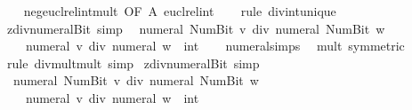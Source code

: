 \begin{isabellebody}
%
\isadelimproof
\ \ %
\endisadelimproof
%
\isatagproof
{}\isamarkupfalse%
\ neg{\isacharunderscore}{\kern0pt}eucl{\isacharunderscore}{\kern0pt}rel{\isacharunderscore}{\kern0pt}int{\isacharunderscore}{\kern0pt}mult{\isacharunderscore}{\kern0pt}{}\ {\isacharbrackleft}{\kern0pt}OF\ A\ eucl{\isacharunderscore}{\kern0pt}rel{\isacharunderscore}{\kern0pt}int{\isacharbrackright}{\kern0pt}\isanewline
\ \ \isamarkupfalse%
\ {\isacharparenleft}{\kern0pt}rule\ div{\isacharunderscore}{\kern0pt}int{\isacharunderscore}{\kern0pt}unique{\isacharparenright}{\kern0pt}%
\endisatagproof
{\isafoldproof}%
%
\isadelimproof
\isanewline
%
\endisadelimproof
\isanewline
{}\isamarkupfalse%
\ zdiv{\isacharunderscore}{\kern0pt}numeral{\isacharunderscore}{\kern0pt}Bit{}\ {\isacharbrackleft}{\kern0pt}simp{\isacharbrackright}{\kern0pt}{\isacharcolon}{\kern0pt}\isanewline
\ \ {\isachardoublequoteopen}numeral\ {\isacharparenleft}{\kern0pt}Num{\isachardot}{\kern0pt}Bit{}\ v{\isacharparenright}{\kern0pt}\ div\ numeral\ {\isacharparenleft}{\kern0pt}Num{\isachardot}{\kern0pt}Bit{}\ w{\isacharparenright}{\kern0pt}\ {\isacharequal}{\kern0pt}\isanewline
\ \ \ \ numeral\ v\ div\ {\isacharparenleft}{\kern0pt}numeral\ w\ {\isacharcolon}{\kern0pt}{\isacharcolon}{\kern0pt}\ int{\isacharparenright}{\kern0pt}{\isachardoublequoteclose}\isanewline
%
\isadelimproof
\ \ %
\endisadelimproof
%
\isatagproof
{}\isamarkupfalse%
\ numeral{\isachardot}{\kern0pt}simps\ \isamarkupfalse%
\ mult{\isacharunderscore}{\kern0pt}{}\ {\isacharbrackleft}{\kern0pt}symmetric{\isacharbrackright}{\kern0pt}\isanewline
\ \ \isamarkupfalse%
\ {\isacharparenleft}{\kern0pt}rule\ div{\isacharunderscore}{\kern0pt}mult{\isacharunderscore}{\kern0pt}mult{}{\isacharcomma}{\kern0pt}\ simp{\isacharparenright}{\kern0pt}%
\endisatagproof
{\isafoldproof}%
%
\isadelimproof
\isanewline
%
\endisadelimproof
\isanewline
{}\isamarkupfalse%
\ zdiv{\isacharunderscore}{\kern0pt}numeral{\isacharunderscore}{\kern0pt}Bit{}\ {\isacharbrackleft}{\kern0pt}simp{\isacharbrackright}{\kern0pt}{\isacharcolon}{\kern0pt}\isanewline
\ \ {\isachardoublequoteopen}numeral\ {\isacharparenleft}{\kern0pt}Num{\isachardot}{\kern0pt}Bit{}\ v{\isacharparenright}{\kern0pt}\ div\ numeral\ {\isacharparenleft}{\kern0pt}Num{\isachardot}{\kern0pt}Bit{}\ w{\isacharparenright}{\kern0pt}\ {\isacharequal}{\kern0pt}\isanewline
\ \ \ \ {\isacharparenleft}{\kern0pt}numeral\ v\ div\ {\isacharparenleft}{\kern0pt}numeral\ w\ {\isacharcolon}{\kern0pt}{\isacharcolon}{\kern0pt}\ int{\isacharparenright}{\kern0pt}{\isacharparenright}{\kern0pt}{\isachardoublequoteclose}\isanewline

\end{isabellebody}

